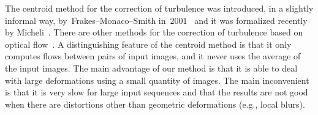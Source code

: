 \documentclass{ipol}
\def\x{\mathbf{x}}
\def\u{\mathbf{u}}
\begin{document}

The centroid method for the correction of turbulence was introduced, in a
slightly informal way, by~Frakes--Monaco--Smith
in~$2001$~\cite{frakes2001suppression} and it was formalized recently by
Micheli~\cite{micheli2013}.  There are other methods for the correction of
turbulence based on optical flow~\cite{maogilles2012}.  A distinguishing
feature of the centroid method is that it only computes flows between pairs of
input images, and it never uses the average of the input images.  The main
advantage of our method is that it is able to deal with large deformations
using a small quantity of images.  The main inconvenient is that it is very
slow for large input sequences and that the results are not good when there
are distortions other than geometric deformations (e.g., local blurs).

\end{document}
